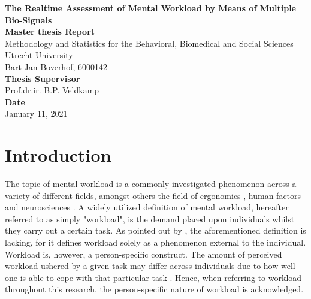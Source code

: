 \documentclass[12pt]{article}
\begin{document}
\begin{titlepage}
\begin{center}
\LARGE{\textbf{The Realtime Assessment of Mental Workload by Means of Multiple Bio-Signals}}\\
\vspace*{2\baselineskip}
\Large{\textbf{Master thesis Report}}\\
Methodology and Statistics for the Behavioral, Biomedical and Social Sciences\\
\vspace*{1\baselineskip}
Utrecht University\\
\vspace*{4\baselineskip}
{Bart-Jan Boverhof, 6000142}\\
\vspace*{1\baselineskip}
{\textbf{Thesis Supervisor}}\\
Prof.dr.ir. B.P. Veldkamp\\
\vspace*{1\baselineskip}
{\textbf{Date}}\\
January 11, 2021\\
\vspace*{1\baselineskip}
\end{center}
\end{titlepage}

\section{Introduction}
The topic of mental workload is a commonly investigated 
phenomenon across a variety of different fields, amongst others the field of ergonomics \cite{young2015state}, human factors \cite{pretorius2007development} and neurosciences \cite{shuggi2017mental}. A widely utilized definition of mental workload, hereafter referred to as simply "workload", is the demand placed upon individuals whilst they carry out a certain task. As pointed out by , the aforementioned definition is lacking, for it defines workload solely as a phenomenon external to the individual. Workload is, however, a person-specific construct. The amount of perceived workload ushered by a given task may differ across individuals due to how well one is able to cope with that particular task \cite{de1996measurement}. Hence, when referring to workload throughout this research, the person-specific nature of workload is acknowledged.
\end{document}
